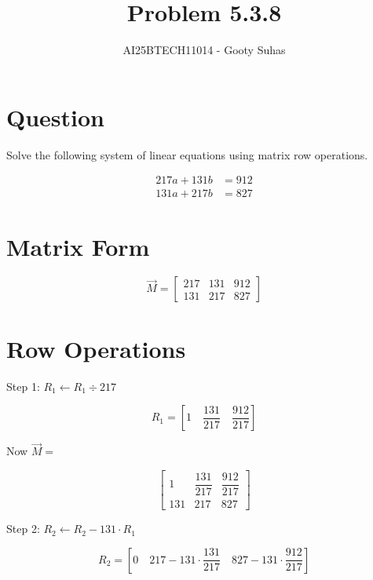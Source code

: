 \documentclass[journal]{IEEEtran}
\begin{document}

\vspace{3cm}

\title{Problem 5.3.8 }
\author{AI25BTECH11014 - Gooty Suhas}
\maketitle
\section*{\large\textbf{Question}}
\vspace{0.5cm}
Solve the following system of linear equations using matrix row operations.

\[
\begin{aligned}
217a + 131b &= 912 \\
131a + 217b &= 827
\end{aligned}
\]

\vspace{0.4cm}
\section*{\large\textbf{Matrix Form}}

\[
\vec{M} =
\left[
\begin{array}{cc|c}
217 & 131 & 912 \\
131 & 217 & 827
\end{array}
\right]
\]

\vspace{0.4cm}
\section*{\large\textbf{Row Operations}}

Step 1: \( R_1 \leftarrow R_1 \div 217 \)

\[
R_1 =
\left[
1 \quad \dfrac{131}{217} \quad \dfrac{912}{217}
\right]
\]

\vspace{0.3cm}
Now \( \vec{M} = \)

\[
\left[
\begin{array}{ccc}
1 & \dfrac{131}{217} & \dfrac{912}{217} \\
131 & 217 & 827
\end{array}
\right]
\]

\vspace{0.4cm}
Step 2: \( R_2 \leftarrow R_2 - 131 \cdot R_1 \)

\[
R_2 =
\left[
0 \quad 217 - 131 \cdot \dfrac{131}{217} \quad 827 - 131 \cdot \dfrac{912}{217}
\right]
\]
\end{document}
